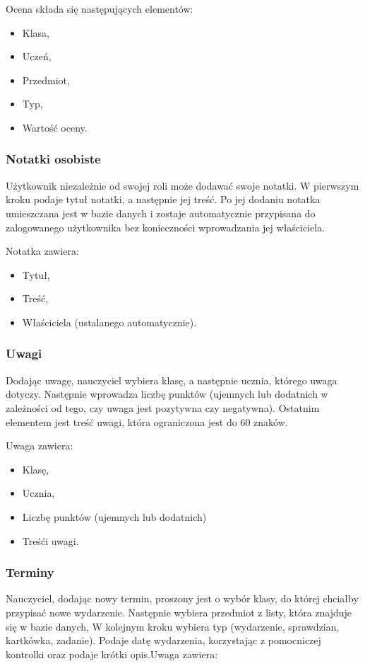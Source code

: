 Ocena składa się następujących elementów:
\begin{itemize}
      \item Klasa,
      \item Uczeń,
      \item Przedmiot,
      \item Typ,
      \item Wartość oceny.
\end{itemize}

\subsubsection{Notatki osobiste}
\label{notatki}
Użytkownik niezależnie od swojej roli może dodawać swoje notatki. W pierwszym kroku podaje tytuł notatki, a następnie jej treść. Po jej dodaniu notatka umieszczana jest w bazie danych i zostaje automatycznie przypisana do zalogowanego użytkownika bez konieczności wprowadzania jej właściciela.

Notatka zawiera:
\begin{itemize}
      \item Tytuł,
      \item Treść,
      \item Właściciela (ustalanego automatycznie).
\end{itemize}

\subsubsection{Uwagi}
\label{uwagi}
Dodając uwagę, nauczyciel wybiera klasę, a następnie ucznia, którego uwaga dotyczy. Następnie wprowadza liczbę punktów (ujemnych lub dodatnich w zależności od tego, czy uwaga jest pozytywna czy negatywna). Ostatnim elementem jest treść uwagi, która ograniczona jest do 60 znaków. 

Uwaga zawiera:
\begin{itemize}
      \item Klasę,
      \item Ucznia,
      \item Liczbę punktów (ujemnych lub dodatnich)
      \item Treśći uwagi.
\end{itemize}

\subsubsection{Terminy}
\label{terminy}
Nauczyciel, dodając nowy termin, proszony jest o wybór klasy, do której chciałby przypisać nowe wydarzenie. Następnie wybiera przedmiot z listy, która znajduje się w bazie danych, W kolejnym kroku wybiera typ (wydarzenie, sprawdzian, kartkówka, zadanie). Podaje datę wydarzenia, korzystając z pomocniczej kontrolki oraz podaje krótki opis.Uwaga zawiera:

